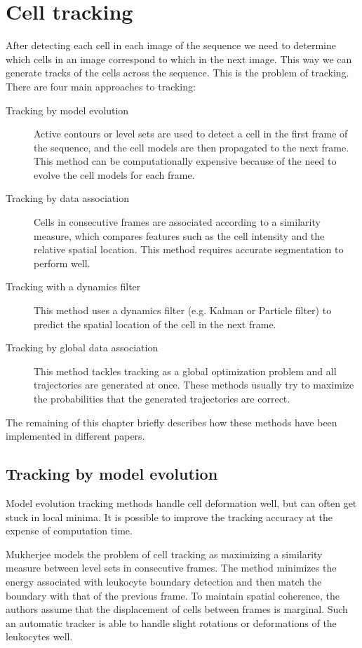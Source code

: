 \section{Cell tracking}
\label{sec:tracking}

After detecting each cell in each image of the sequence we need to determine which cells in an image correspond to which in the next image. This way we can generate tracks of the cells across the sequence. This is the problem of tracking. There are four main approaches to tracking:

\begin{description}
	\item [Tracking by model evolution] Active contours or level sets are used to detect a cell in the first frame of the sequence, and the cell models are then propagated to the next frame. This method can be computationally expensive because of the need to evolve the cell models for each frame.
	\item [Tracking by data association] Cells in consecutive frames are associated according to a similarity measure, which compares features such as the cell intensity and the relative spatial location. This method requires accurate segmentation to perform well.
	\item [Tracking with a dynamics filter] This method uses a dynamics filter (e.g. Kalman or Particle filter) to predict the spatial location of the cell in the next frame.
	\item [Tracking by global data association] This method tackles tracking as a global optimization problem and all trajectories are generated at once. These methods usually try to maximize the probabilities that the generated trajectories are correct.
\end{description}

The remaining of this chapter briefly describes how these methods have been implemented in different papers.

\subsection{Tracking by model evolution}

Model evolution tracking methods handle cell deformation well, but can often get stuck in local minima. It is possible to improve the tracking accuracy at the expense of computation time.

Mukherjee \cite{mukherjee04} models the problem of cell tracking as maximizing a similarity measure between level sets in consecutive frames. The method minimizes the energy associated with leukocyte boundary detection and then match the boundary with that of the previous frame. To maintain spatial coherence, the authors assume that the displacement of cells between frames is marginal. Such an automatic tracker is able to handle slight rotations or deformations of the leukocytes well.

